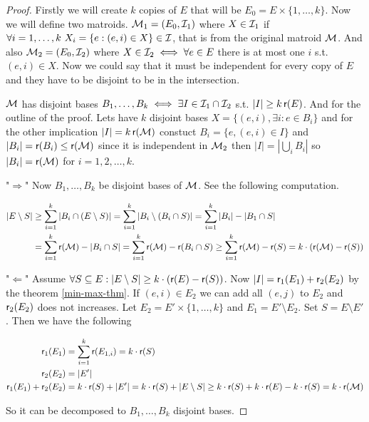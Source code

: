 \begin{proof}
	Firstly we will create $k$ copies of $E$ that will be $E_0 = E \times \{1, \dots, k\}$. Now we will define two matroids. $\mathcal{M}_1 = (E_0, \mathcal{I}_1)$ where $X \in \mathcal{I}_1$ if $\forall i = 1, \dots, k \ X_i = \{e : (e,i) \in X\} \in \mathcal{I}$, that is from the original matroid $\mathcal{M}$. And also $\mathcal{M}_2 = (E_0, \mathcal{I}_2)$ where $X \in \mathcal{I}_2 \iff \forall e \in E$ there is at most one $i$ s.t. $(e,i) \in X$. Now we could say that it must be independent for every copy of $E$ and they have to be disjoint to be in the intersection.

	$\mathcal{M}$ has disjoint bases $B_1, \dots, B_k \iff \exists I \in \mathcal{I}_1 \cap \mathcal{I}_2$ s.t. $|I| \geq k \operatorname{\textsf{r}}(E)$. And for the outline of the proof. Lets have $k$ disjoint bases $X = \{(e,i), \exists i : e \in B_i\}$ and for the other implication $|I| = k \operatorname{\textsf{r}}(\mathcal{M})$ constuct $B_i = \{e, (e,i) \in I\}$ and $|B_i| = \operatorname{\textsf{r}} (B_i) \leq \operatorname{\textsf{r}}(\mathcal{M})$ since it is independent in $\mathcal{M}_2$ then $|I| = |\bigcup_i B_i|$ so $|B_i| = \operatorname{\textsf{r}}(\mathcal{M})$ for $i = 1,2, \dots, k$.

	"$\Rightarrow$" Now $B_1, \dots, B_k$ be disjoint bases of $\mathcal{M}$. See the following computation.

	$$
	\begin{aligned}
		|E \setminus S| &\geq \sum_{i=1}^k |B_i \cap (E \setminus S)| = \sum_{i=1}^k |B_i \setminus (B_i \cap S)| = \sum_{i=1}^k |B_i| - |B_1 \cap S| \\
		&= \sum_{i=1}^k \operatorname{\textsf{r}}(\mathcal{M}) - |B_i \cap S| = \sum_{i=1}^k \operatorname{\textsf{r}}(\mathcal{M}) - \operatorname{\textsf{r}}(B_i \cap S) \geq \sum_{i=1}^k \operatorname{\textsf{r}}(\mathcal{M}) - \operatorname{\textsf{r}}(S) = k \cdot (\operatorname{\textsf{r}}(\mathcal{M}) - \operatorname{\textsf{r}}(S))
	\end{aligned}
	$$

	"$\Leftarrow$" Assume $\forall S \subseteq E : |E \setminus S| \geq k \cdot (\operatorname{\textsf{r}}(E) - \operatorname{\textsf{r}}(S))$. Now $|I| = \operatorname{\textsf{r}}_1 (E_1) + \operatorname{\textsf{r}}_2 (E_2)$ by the theorem \ref{min-max-thm}. If $(e,i) \in E_2$ we can add all $(e,j)$ to $E_2$ and $\operatorname{\textsf{r}}_2(E_2)$ does not increases. Let $E_2 = E' \times \{1, \dots, k\}$ and $E_1 = E' \setminus E_2$. Set $S = E \setminus E'$. Then we have the following

	$$
	\begin{aligned}
		\operatorname{\textsf{r}}_1 (E_1) &= \sum_{i=1}^k \operatorname{\textsf{r}}(E_{1,i}) = k \cdot \operatorname{\textsf{r}}(S) \\
		\operatorname{\textsf{r}}_2 (E_2) &= |E'|\\
		\operatorname{\textsf{r}}_1(E_1) + \operatorname{\textsf{r}}_2(E_2) &= k \cdot \operatorname{\textsf{r}}(S) + |E'| = k \cdot \operatorname{\textsf{r}}(S) + |E \setminus S| \geq k \cdot \operatorname{\textsf{r}}(S) + k \cdot \operatorname{\textsf{r}}(E) - k \cdot \operatorname{\textsf{r}}(S) = k \cdot \operatorname{\textsf{r}}(\mathcal{M})
	\end{aligned}
	$$

	\noindent So it can be decomposed to $B_1, \dots, B_k$ disjoint bases.
\end{proof}
